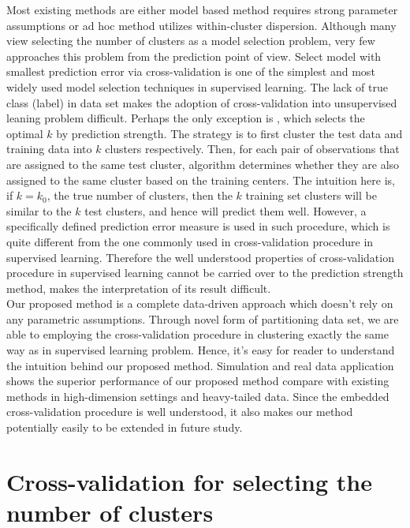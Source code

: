 \documentclass[11pt]{article}
\begin{document}
Most existing methods are either model based method requires strong parameter assumptions or ad hoc method utilizes within-cluster dispersion. Although many view selecting the number of clusters as a model selection problem, very few approaches this problem from the prediction point of view. Select model with smallest prediction error via cross-validation is one of the simplest and most widely used model selection techniques in supervised learning. The lack of true class (label) in data set makes the adoption of cross-validation into unsupervised leaning problem difficult. Perhaps the only exception is \cite{tibshirani2005cluster}, which selects the optimal $k$ by prediction strength. The strategy is to first cluster the test data and training data into $k$ clusters respectively. Then, for each pair of observations that are assigned to the same test cluster, algorithm determines whether they are also assigned to the same cluster based on the training centers. The intuition here is, if $k=k_0$, the true number of clusters, then the $k$ training set clusters will be similar to the $k$ test clusters, and hence will predict them well. However, a specifically defined prediction error measure is used in such procedure, which is quite different from the one commonly used in cross-validation procedure in supervised learning. Therefore the well understood properties of cross-validation procedure in supervised learning cannot be carried over to the prediction strength method, makes the interpretation of its result difficult. \\

Our proposed method is a complete data-driven approach which doesn't rely on any parametric assumptions. Through novel form of partitioning data set, we are able to employing the cross-validation procedure in clustering exactly the same way as in supervised learning problem. Hence, it's easy for reader to understand the intuition behind our proposed method. Simulation and real data application shows the superior performance of our proposed method compare with existing methods in high-dimension settings and heavy-tailed data. Since the embedded cross-validation procedure is well understood, it also makes our method potentially easily to be extended in future study. 
 

\section{Cross-validation for selecting the number of clusters}
\end{document}

